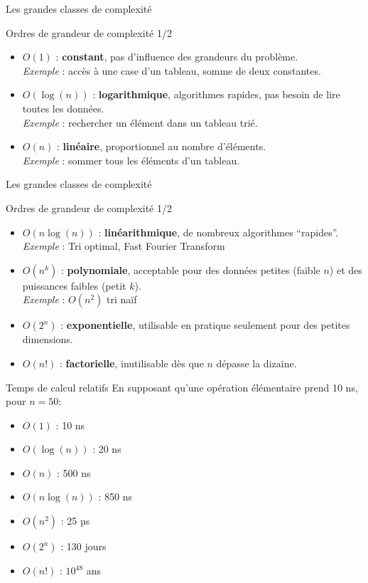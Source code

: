 \documentclass{beamer}
\begin{document}
\begin{frame}{Les grandes classes de complexité}
\begin{block}{Ordres de grandeur de complexité 1/2}
\begin{itemize}
\item $O(1)$ : \textbf{constant}, pas d'influence des grandeurs du problème. \\
\textit{Exemple} : accès à une case d'un tableau, somme de deux constantes.
\item $O(\log(n))$ : \textbf{logarithmique}, algorithmes rapides, pas besoin de lire toutes les données.\\
\textit{Exemple} : rechercher un élément dans un tableau trié.
\item $O(n)$ : \textbf{linéaire}, proportionnel au nombre d'éléments.\\
\textit{Exemple} : sommer tous les éléments d'un tableau.
\end{itemize}
\end{block}
\end{frame}

\begin{frame}{Les grandes classes de complexité}
\begin{block}{Ordres de grandeur de complexité 1/2}
\begin{itemize}
\item $O(n\log(n))$ : \textbf{linéarithmique}, de nombreux algorithmes ``rapides''.\\
\textit{Exemple} : Tri optimal, Fast Fourier Transform
\item $O(n^k)$ : \textbf{polynomiale}, acceptable pour des données petites (faible $n$) et des puissances faibles (petit $k$).\\
\textit{Exemple} : $O(n^2)$ tri naïf
\item $O(2^n)$ : \textbf{exponentielle}, utilisable en pratique seulement pour des petites dimensions.
\item $O(n!)$ : \textbf{factorielle}, inutilisable dès que $n$ dépasse la dizaine.
\end{itemize}
\end{block}
\end{frame}

\begin{frame}{Temps de calcul relatifs}
En supposant qu'une opération élémentaire prend 10 ns, pour $n = 50$:
\begin{itemize}
    \item $O(1)$ : 10 ns
    \item $O(\log(n))$ : 20 ns
    \item $O(n)$ : 500 ns
    \item $O(n\log(n))$ : 850 ns
    \item $O(n^{2})$ : 25 µs
    \item $O(2^n)$ : 130 jours
    \item $O(n!)$ : $10^{48}$ ans
\end{itemize}
\end{frame}
\end{document}
